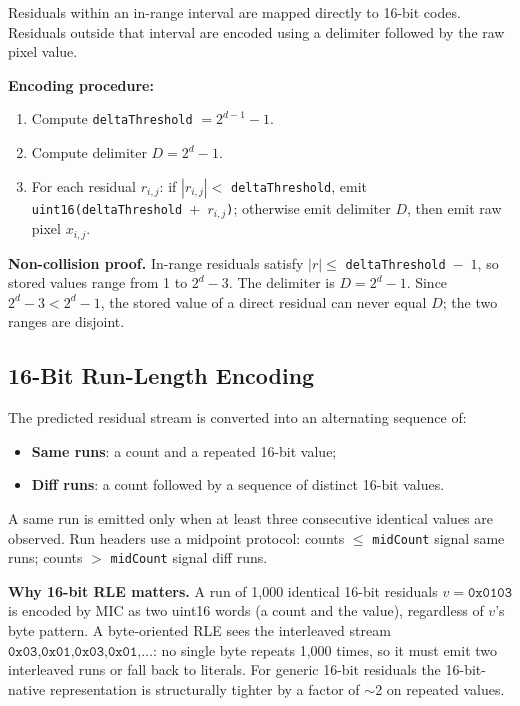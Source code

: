 \documentclass[journal]{IEEEtran}
\begin{document}
Residuals within an in-range interval are mapped directly to 16-bit codes.
Residuals outside that interval are encoded using a delimiter followed by the
raw pixel value.

\textbf{Encoding procedure:}
\begin{enumerate}
  \item Compute \texttt{deltaThreshold} $= 2^{d-1} - 1$.
  \item Compute delimiter $D = 2^d - 1$.
  \item For each residual $r_{i,j}$: if $|r_{i,j}| <$ \texttt{deltaThreshold},
  emit \texttt{uint16(deltaThreshold $+$ $r_{i,j}$)}; otherwise emit delimiter
  $D$, then emit raw pixel $x_{i,j}$.
\end{enumerate}

\textbf{Non-collision proof.} In-range residuals satisfy $|r| \leq$
\texttt{deltaThreshold}~$-$~$1$, so stored values range from 1 to $2^d - 3$.
The delimiter is $D = 2^d - 1$. Since $2^d - 3 < 2^d - 1$, the stored value of
a direct residual can never equal $D$; the two ranges are disjoint.

\subsection{16-Bit Run-Length Encoding}

The predicted residual stream is converted into an alternating sequence of:
\begin{itemize}
  \item \textbf{Same runs}: a count and a repeated 16-bit value;
  \item \textbf{Diff runs}: a count followed by a sequence of distinct 16-bit
  values.
\end{itemize}

A same run is emitted only when at least three consecutive identical values are
observed. Run headers use a midpoint protocol: counts $\leq$ \texttt{midCount}
signal same runs; counts $>$ \texttt{midCount} signal diff runs.

\textbf{Why 16-bit RLE matters.} A run of 1,000 identical 16-bit residuals
$v = \texttt{0x0103}$ is encoded by MIC as two uint16 words (a count and the
value), regardless of $v$'s byte pattern. A byte-oriented RLE sees the
interleaved stream $\texttt{0x03,0x01,0x03,0x01,\ldots}$: no single byte
repeats 1,000 times, so it must emit two interleaved runs or fall back to
literals. For generic 16-bit residuals the 16-bit-native representation is
structurally tighter by a factor of $\sim$2 on repeated values.
\end{document}
